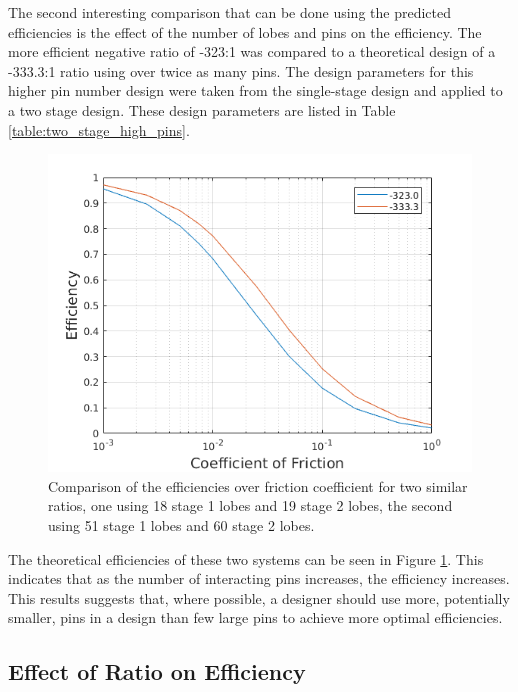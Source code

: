 The second interesting comparison that can be done using the predicted efficiencies is the effect of the number of lobes and pins on the efficiency. The more efficient negative ratio of -323:1 was compared to a theoretical design of a -333.3:1 ratio using over twice as many pins. The design parameters for this higher pin number design were taken from the single-stage design and applied to a two stage design. These design parameters are listed in Table \ref{table:two_stage_high_pins}. 

\begin{figure}[t]
	\centering
	\includegraphics[width=0.75\linewidth]{fig/two_stage_more_pins}
   \caption{Comparison of the efficiencies over friction coefficient for two similar ratios, one using 18 stage 1 lobes and 19 stage 2 lobes, the second using 51 stage 1 lobes and 60 stage 2 lobes.}
   \label{fig:two_stage_more_pins}
\end{figure}

The theoretical efficiencies of these two systems can be seen in Figure \ref{fig:two_stage_more_pins}. This indicates that as the number of interacting pins increases, the efficiency increases. This results suggests that, where possible, a designer should use more, potentially smaller, pins in a design than few large pins to achieve more optimal efficiencies. 



\subsection{Effect of Ratio on Efficiency} \label{ch:dual:discussion:ratio}

